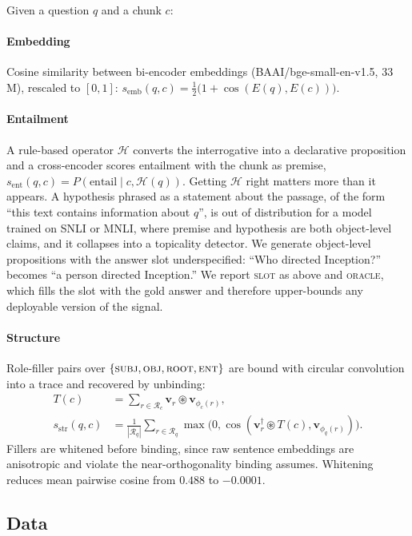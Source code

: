\documentclass[conference]{IEEEtran}
\newcommand{\semb}{s_{\mathrm{emb}}}
\newcommand{\sstr}{s_{\mathrm{str}}}
\newcommand{\sent}{s_{\mathrm{ent}}}
\newcommand{\conv}{\circledast}
\DeclareMathOperator{\cossim}{cos}
\begin{document}
Given a question $q$ and a chunk $c$:

\paragraph{Embedding} Cosine similarity between bi-encoder embeddings
(BAAI/bge-small-en-v1.5, 33\,M), rescaled to $[0,1]$:
$\semb(q,c)=\tfrac12\big(1+\cossim(E(q),E(c))\big)$.

\paragraph{Entailment} A rule-based operator $\mathcal{H}$ converts the
interrogative into a declarative proposition and a cross-encoder scores
entailment with the chunk as premise,
$\sent(q,c)=P(\text{entail}\mid c,\mathcal{H}(q))$. Getting $\mathcal{H}$ right
matters more than it appears. A hypothesis phrased as a statement about the
passage, of the form ``this text contains information about $q$'', is out of
distribution for a model trained on SNLI or MNLI, where premise and hypothesis
are both object-level claims, and it collapses into a topicality detector. We
generate object-level propositions with the answer slot underspecified: ``Who
directed Inception?'' becomes ``a person directed Inception.'' We report
\textsc{slot} as above and \textsc{oracle}, which fills the slot with the gold
answer and therefore upper-bounds any deployable version of the signal.

\paragraph{Structure} Role-filler pairs over
$\{\textsc{subj},\textsc{obj},\textsc{root},\textsc{ent}\}$ are bound with
circular convolution into a trace and recovered by unbinding:
\begin{align}
T(c) &= \textstyle\sum_{r\in\mathcal{R}_c}\mathbf{v}_r\conv\mathbf{v}_{\phi_c(r)},\\
\sstr(q,c) &= \tfrac{1}{|\mathcal{R}_q|}\textstyle\sum_{r\in\mathcal{R}_q}
\max\!\big(0,\cossim(\mathbf{v}_r^{\dagger}\conv T(c),\mathbf{v}_{\phi_q(r)})\big).
\end{align}
Fillers are whitened before binding, since raw sentence embeddings are
anisotropic and violate the near-orthogonality binding assumes. Whitening
reduces mean pairwise cosine from $0.488$ to $-0.0001$.

\subsection{Data}
\end{document}
